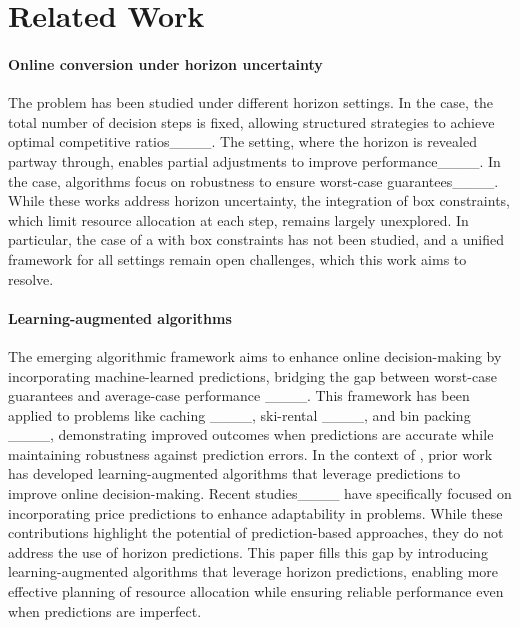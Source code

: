 \section{Related Work}
\paragraph{Online conversion under horizon uncertainty} 
The \OC problem has been studied under different horizon settings. In the \OCK case, the total number of decision steps is fixed, allowing structured strategies to achieve optimal competitive ratios____. The \OCN setting, where the horizon is revealed partway through, enables partial adjustments to improve performance____. In the \OCU case, algorithms focus on robustness to ensure worst-case guarantees____. While these works address horizon uncertainty, the integration of box constraints, which limit resource allocation at each step, remains largely unexplored. In particular, the case of a \OCK with box constraints has not been studied, and a unified framework for all settings remain open challenges, which this work aims to resolve.

\paragraph{Learning-augmented algorithms}
The emerging algorithmic framework aims to enhance online decision-making by incorporating machine-learned predictions, bridging the gap between worst-case guarantees and average-case performance ____. This framework has been applied to problems like caching ____, ski-rental ____, and bin packing ____, demonstrating improved outcomes when predictions are accurate while maintaining robustness against prediction errors. In the context of \OC, prior work has developed learning-augmented algorithms that leverage predictions to improve online decision-making. Recent studies____ have specifically focused on incorporating price predictions to enhance adaptability in \OC problems. While these contributions highlight the potential of prediction-based approaches, they do not address the use of horizon predictions. This paper fills this gap by introducing learning-augmented algorithms that leverage horizon predictions, enabling more effective planning of resource allocation while ensuring reliable performance even when predictions are imperfect.

